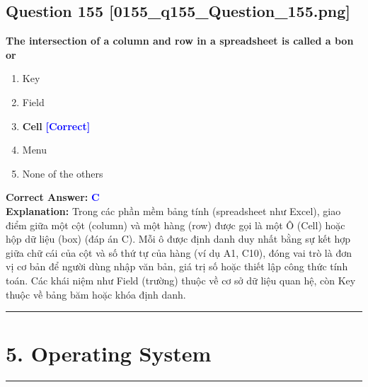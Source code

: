 \documentclass[11pt,a4paper]{article}
\begin{document}
\begin{minipage}{\textwidth}
\subsection*{Question 155 \quad \footnotesize{[0155\_q155\_Question\_155.png]}}
\noindent \textbf{The intersection of a column and row in a spreadsheet is called a bon or}

\begin{enumerate}[label=\Alph*.]
    \item Key
    \item Field
    \item \textbf{Cell} \hfill \textcolor{blue}{\textbf{[Correct]}}
    \item Menu
    \item None of the others
\end{enumerate}

\noindent \textbf{Correct Answer:} \textcolor{blue}{\textbf{C}} \\[2pt]
\noindent \textbf{Explanation:} Trong các phần mềm bảng tính (spreadsheet như Excel), giao điểm giữa một cột (column) và một hàng (row) được gọi là một Ô (Cell) hoặc hộp dữ liệu (box) (đáp án C). Mỗi ô được định danh duy nhất bằng sự kết hợp giữa chữ cái của cột và số thứ tự của hàng (ví dụ A1, C10), đóng vai trò là đơn vị cơ bản để người dùng nhập văn bản, giá trị số hoặc thiết lập công thức tính toán. Các khái niệm như Field (trường) thuộc về cơ sở dữ liệu quan hệ, còn Key thuộc về bảng băm hoặc khóa định danh.

\par\vspace{0.3cm}
\hrule
\vspace{0.3cm}
\end{minipage}


\newpage
\section*{5. Operating System}
\hrule\vspace{0.5cm}
\end{document}
